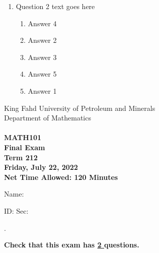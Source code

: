 \documentclass[amsfonts,bezier,leqno,fleqn,12pt,a4paper]{article}
\begin{document}
{\begin{large}
\begin{enumerate}
\begin{enumerate}
\end{enumerate}

\vspace {3.5cm}


\item Question 2 text goes here
\vspace {0.3in}
\setcounter{equation}{0}

\begin{enumerate}
\item  Answer 4
\item  Answer 2
\item  Answer 3
\item  Answer 5
\item  Answer 1

\end{enumerate}
\newpage


\end{enumerate}
\end{large}


\newpage


\thispagestyle{empty}
\begin{center}
    \begin{large}
        King Fahd University of Petroleum and Minerals \\ 
        Department of Mathematics  \\ 
        \vspace*{4.5cm}
        {\bf {} }  \hfill {\bf {}} \\
        {\bf MATH101 }  \\
        {\bf Final Exam }  \\
        {\bf Term 212 }  \\
        {\bf Friday, July 22, 2022 }  \\ 
        {\bf Net Time Allowed: 120 Minutes }  \\
        \vspace*{0.2cm}

    \end{large}
\end{center}

\large{Name:  }\hrulefill

\vspace{3mm}

\large{ID: } \hrulefill \large{  Sec: } \hrulefill \large{.

\vspace{1cm}

\large{\bf{Check that this exam has {\underline{ 2 }} questions.}}

\vspace{1cm}

}}
\end{document}
